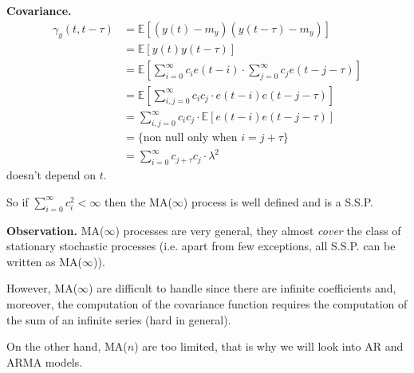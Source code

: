 \textbf{Covariance.}
\begin{align*}
	\gamma_{y}(t, t-\tau) &=\mathbb{E}[(y(t)-m_{y}) (y(t-\tau)-m_{y})]\\
	&=\mathbb{E}[y(t) y(t-\tau)]\\
	&=\mathbb{E}\left[\sum_{i=0}^{\infty} c_{i} e(t-i) \cdot \sum_{j=0}^{\infty} c_{j} e(t-j-\tau)\right]\\
	&=\mathbb{E}\left[\sum_{i, j=0}^{\infty} c_{i} c_{j} \cdot e(t-i) e(t-j-\tau)\right]\\
	&=\sum_{i, j=0}^{\infty} c_{i} c_{j} \cdot \mathbb{E}[e(t-i) e(t-j-\tau)]\\
	&=\{\text{non null only when }i=j+\tau\}\\
	&=\sum_{i=0}^{\infty} c_{j+\tau}c_{j}\cdot\lambda^2 
\end{align*}
doesn't depend on $t$.

So if $\sum_{i=0}^{\infty} c_{i}^{2}<\infty$ then the MA($\infty $) process is well defined and is a S.S.P.

\textbf{Observation.} MA($\infty$) processes are very general, they almost \emph{cover} the class of stationary stochastic processes (i.e. apart from few exceptions, all S.S.P. can be written as MA($\infty$)).

However, MA($\infty$) are difficult to handle since there are infinite coefficients and, moreover, the computation of the covariance function requires the computation of the sum of an infinite series (hard in general).

On the other hand, MA($n$) are too limited, that is why we will look into AR and ARMA models.